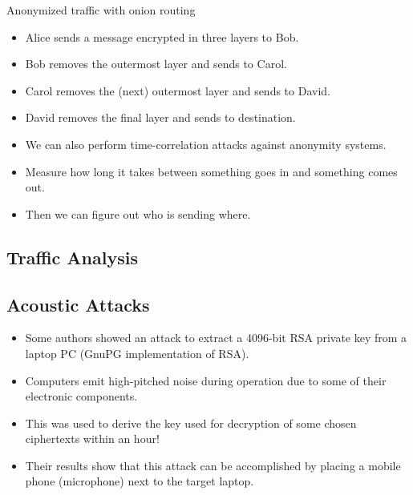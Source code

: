 \documentclass{beamer}
\begin{document}
\begin{frame}
  \begin{block}{Anonymized traffic with onion routing}
    \begin{itemize}
      \item Alice sends a message encrypted in three layers to Bob.
      \item Bob removes the outermost layer and sends to Carol.
      \item Carol removes the (next) outermost layer and sends to David.
      \item David removes the final layer and sends to destination.
    \end{itemize}
  \end{block}

  \pause{}

  \begin{example}
    \begin{itemize}
      \item We can also perform time-correlation attacks against anonymity 
        systems.

      \item Measure how long it takes between something goes in and something 
        comes out.

      \item Then we can figure out who is sending where.
    \end{itemize}
  \end{example}
\end{frame}

\subsection{Traffic Analysis}

\begin{frame}
\end{frame}

\subsection{Acoustic Attacks}

\begin{frame}
  \begin{itemize}
    \item Some authors showed an attack to extract 
      a 4096-bit RSA private key from a laptop PC (GnuPG implementation of 
      RSA).

    \item Computers emit high-pitched noise during operation due to some of 
      their electronic components.

    \item This was used to derive the key used for decryption of some chosen 
      ciphertexts within an hour!

    \item Their results show that this attack can be accomplished by placing 
      a mobile phone (microphone) next to the target laptop.
  \end{itemize}
\end{frame}
\end{document}
